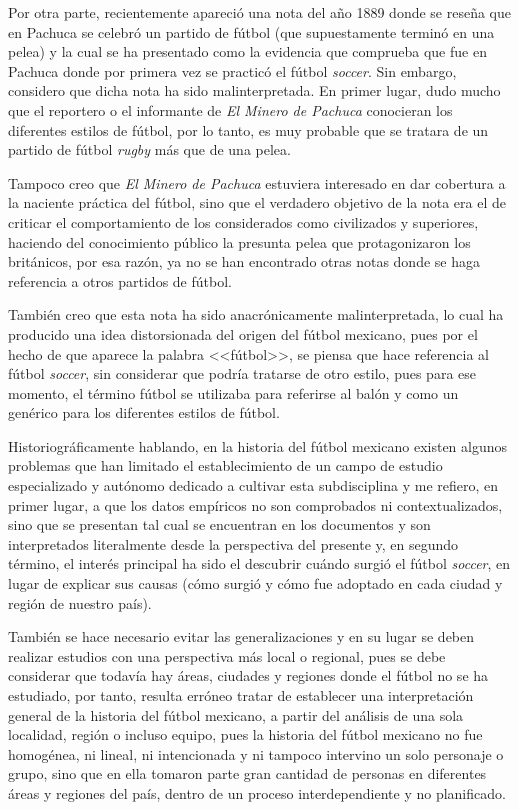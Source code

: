 \documentclass[11pt,a5paper,twoside]{book} %
\begin{document}
Por otra parte, recientemente apareció una nota del año 1889 donde se reseña que en Pachuca se celebró un partido de fútbol (que supuestamente terminó en una pelea) y la cual se ha presentado como la evidencia que comprueba que fue en Pachuca donde por primera vez se practicó el fútbol \emph{soccer}. Sin embargo, considero que dicha nota ha sido malinterpretada. En primer lugar, dudo mucho que el reportero o el informante de \emph{El Minero de Pachuca} conocieran los diferentes estilos de fútbol, por lo tanto, es muy probable que se tratara de un partido de fútbol \emph{rugby} más que de una pelea.

Tampoco creo que \emph{El Minero de Pachuca} estuviera interesado en dar cobertura a la naciente práctica del fútbol, sino que el verdadero objetivo de la nota era el de criticar el comportamiento de los considerados como civilizados y superiores, haciendo del conocimiento público la presunta pelea que protagonizaron los británicos, por esa razón, ya no se han encontrado otras notas donde se haga referencia a otros partidos de fútbol.

También creo que esta nota ha sido anacrónicamente malinterpretada, lo cual ha producido una idea distorsionada del origen del fútbol mexicano, pues por el hecho de que aparece la palabra <<fútbol>>, se piensa que hace referencia al fútbol \emph{soccer}, sin considerar que podría tratarse de otro estilo, pues para ese momento, el término fútbol se utilizaba para referirse al balón y como un genérico para los diferentes estilos de fútbol.

Historiográficamente hablando, en la historia del fútbol mexicano existen algunos problemas que han limitado el establecimiento de un campo de estudio especializado y autónomo dedicado a cultivar esta subdisciplina y me refiero, en primer lugar, a que los datos empíricos no son comprobados ni contextualizados, sino que se presentan tal cual se encuentran en los documentos y son interpretados literalmente desde la perspectiva del presente y, en segundo término, el interés principal ha sido el descubrir cuándo surgió el fútbol \emph{soccer}, en lugar de explicar sus causas (cómo surgió y cómo fue adoptado en cada ciudad y región de nuestro país).

También se hace necesario evitar las generalizaciones y en su lugar se deben realizar estudios con una perspectiva más local o regional, pues se debe considerar que todavía hay áreas, ciudades y regiones donde el fútbol no se ha estudiado, por tanto, resulta erróneo tratar de establecer una interpretación general de la historia del fútbol mexicano, a partir del análisis de una sola localidad, región o incluso equipo, pues la historia del fútbol mexicano no fue homogénea, ni lineal, ni intencionada y ni tampoco intervino un solo personaje o grupo, sino que en ella tomaron parte gran cantidad de personas en diferentes áreas y regiones del país, dentro de un proceso interdependiente y no planificado.
\end{document}

